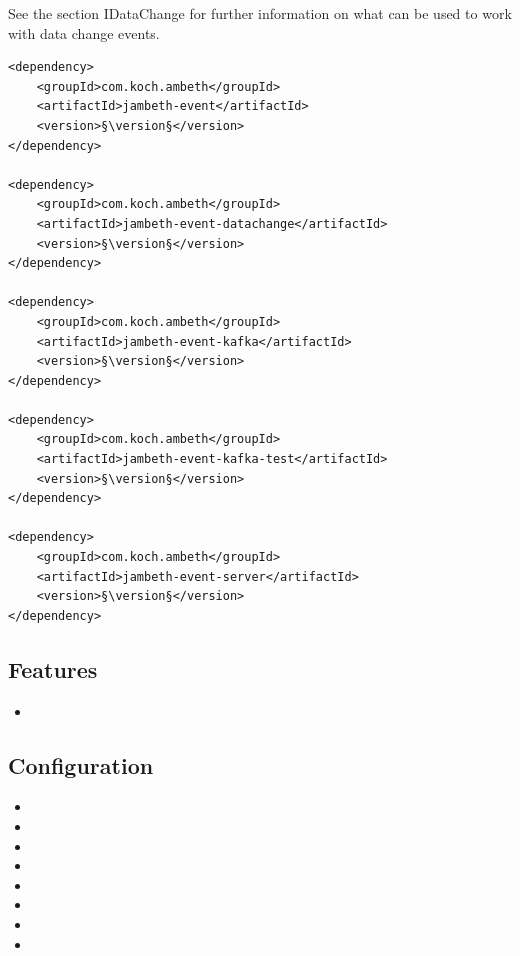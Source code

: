 See the section IDataChange for further information on what can be used to work with data change events.


\begin{lstlisting}[style=POM,caption={Maven modules to use \emph{Ambeth Event}}]
<dependency>
	<groupId>com.koch.ambeth</groupId>
	<artifactId>jambeth-event</artifactId>
	<version>§\version§</version>
</dependency>

<dependency>
	<groupId>com.koch.ambeth</groupId>
	<artifactId>jambeth-event-datachange</artifactId>
	<version>§\version§</version>
</dependency>

<dependency>
	<groupId>com.koch.ambeth</groupId>
	<artifactId>jambeth-event-kafka</artifactId>
	<version>§\version§</version>
</dependency>

<dependency>
	<groupId>com.koch.ambeth</groupId>
	<artifactId>jambeth-event-kafka-test</artifactId>
	<version>§\version§</version>
</dependency>

<dependency>
	<groupId>com.koch.ambeth</groupId>
	<artifactId>jambeth-event-server</artifactId>
	<version>§\version§</version>
</dependency>
\end{lstlisting}
\subsection{Features}
\begin{itemize}
	\item {}
\end{itemize}

\subsection{Configuration}
\begin{itemize}
	\item {}
	\item {}
	\item {}
	\item {}
	\item {}
	\item {}
	\item {}
	\item {}
\end{itemize}
